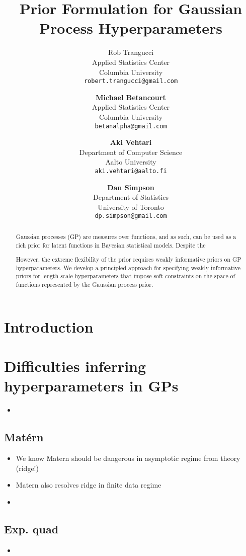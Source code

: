 \documentclass{article}
\title{Prior Formulation for Gaussian Process Hyperparameters}
\author{
  Rob Trangucci \\
  Applied Statistics Center\\
  Columbia University\\
  \texttt{robert.trangucci@gmail.com} 
  \and
  \textbf{Michael Betancourt} \\
  Applied Statistics Center \\
  Columbia University \\
  \texttt{betanalpha@gmail.com} 
  \and
  \textbf{Aki Vehtari} \\
  Department of Computer Science \\
  Aalto University \\
  \texttt{aki.vehtari@aalto.fi} 
  \and
  \textbf{Dan Simpson} \\
  Department of Statistics \\
  University of Toronto \\
  \texttt{dp.simpson@gmail.com} 
}
\begin{document}

\maketitle

\begin{abstract}
  Gaussian processes (GP) are measures over functions, and as such, can be used
  as a rich prior for latent functions in Bayesian statistical models. Despite
	the 
	
	
	However,
  the extreme flexibility of the prior requires weakly informative priors on GP
  hyperparameters. We develop a principled approach for specifying weakly
  informative priors for length scale hyperparameters that impose soft
  constraints on the space of functions represented by the Gaussian process
  prior.
\end{abstract}


\section{Introduction}

\section{Difficulties inferring hyperparameters in GPs}

\begin{itemize}
  \item 
\end{itemize}

\subsection{Mat\'{e}rn}

\begin{itemize}
  \item We know Matern should be dangerous in asymptotic regime from theory (ridge!)
  \item Matern also resolves ridge in finite data regime
  \item 
\end{itemize}

\subsection{Exp. quad}

\begin{itemize}
  \item 
\end{itemize}
\end{document}
